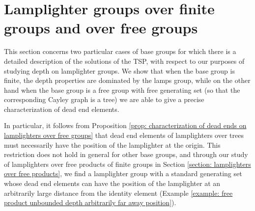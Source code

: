 \documentclass[reqno,oneside]{amsart}
\theoremstyle{plain}
\theoremstyle{definition}
\begin{document}

\section{Lamplighter groups over finite groups and over free groups}\label{section: dead ends on finite and free groups}
This section concerns two particular cases of base groups for which there is a detailed description of the solutions of the TSP, with respect to our purposes of studying depth on lamplighter groups. We show that when the base group is finite, the depth properties are dominated by the lamps group, while on the other hand when the base group is a free group with free generating set (so that the corresponding Cayley graph is a tree) we are able to give a precise characterization of dead end elements. 

In particular, it follows from Proposition \ref{prop: characterization of dead ends on lamplighters over free groups} that dead end elements of lamplighters over trees must necessarily have the position of the lamplighter at the origin. This restriction does not hold in general for other base groups, and through our study of lamplighters over free products of finite groups in Section \ref{section: lamplighters over free products}, we find a lamplighter group with a standard generating set whose dead end elements can have the position of the lamplighter at an arbitrarily large distance from the identity element (Example \ref{example: free product unbounded depth arbitrarily far away position}).
\end{document}
